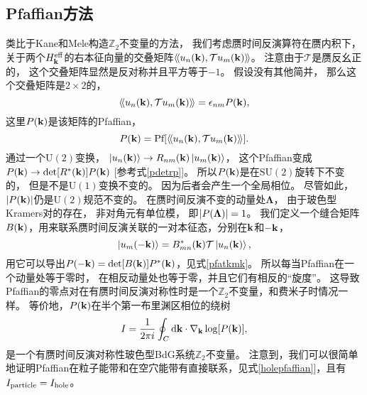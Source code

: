 \subsection{Pfaffian方法}

类比于Kane和Mele构造$\mathbb Z_2$不变量的方法\cite{Kane2005}，
我们考虑赝时间反演算符在赝内积下，
关于两个$H^{\text{eff}}_{\vb k}$的右本征向量的交叠矩阵$\langle\!\langle u_n(\vb k),\mathcal T u_m(\vb k) \rangle\!\rangle$。
注意由于$\mathcal T$是赝反幺正的，
这个交叠矩阵显然是反对称并且平方等于$-1$。
假设没有其他简并，
那么这个交叠矩阵是$2\times 2$的，
\begin{equation}\label{overlap}
	\langle\!\langle u_n(\vb k),\mathcal T u_m(\vb k) \rangle\!\rangle=\epsilon_{nm} P(\vb k),
\end{equation}
这里$P(\vb k)$是该矩阵的Pfaffian，
\begin{equation}
	P(\vb k)=\textnormal{Pf}[\langle\!\langle u_n(\vb k),\mathcal T u_m(\vb k) \rangle\!\rangle].\label{defpf}
\end{equation}
通过一个$\mathrm{U}(2)$变换，
$\ket{u_n(\vb k)} \rightarrow  R_{nm}(\vb k)\ket{u_m(\vb k)}$，
这个Pfaffian变成$P(\vb k) \rightarrow  \det[R^*(\vb k)]P(\vb k)$ [参考式\eqref{pdetrp}]。
所以$P(\vb k)$是在$\mathrm{SU}(2)$旋转下不变的，
但是不是$\mathrm{U}(1)$变换不变的。
因为后者会产生一个全局相位。
尽管如此，
$\abs{P(\vb k)}$仍是$\mathrm{U}(2)$规范不变的。
在赝时间反演不变的动量处$\boldsymbol{\Lambda} $，
由于玻色型Kramers对的存在，
非对角元有单位模，
即$\abs{P(\boldsymbol{\Lambda} )}=1$。
我们定义一个缝合矩阵$B(\vb k)$，用来联系赝时间反演关联的一对本征态，分别在$\vb k$和$-\vb k$，
\begin{equation}
	\ket{u_m(-\vb k)}=B^*_{mn}(\vb k)\mathcal T \ket{u_n(\vb k)},\label{sewingm}
\end{equation}
用它可以导出$P(-\vb k)=\det[B(\vb k)] P^*(\vb k)$，见式\eqref{pfatkmk}。
所以每当Pfaffian在一个动量处等于零时，
在相反动量处也等于零，并且它们有相反的“旋度”。
这导致Pfaffian的零点对在有赝时间反演对称性时是一个$\mathbb Z_2$不变量，和费米子时情况一样\cite{Kane2005}。
等价地，$P(\vb k)$在半个第一布里渊区相位的绕树\begin{equation}
	I= \frac{1}{2\pi i}\oint_C \dd{\vb k}\cdot\nabla_{\vb k}\log[P(\vb k)],\nonumber
\end{equation}
是一个有赝时间反演对称性玻色型BdG系统$\mathbb Z_2$不变量。
注意到，我们可以很简单地证明Pfaffian在粒子能带和在空穴能带有直接联系，见式\eqref{holepfaffian}]，且有$I_\textnormal{particle}=I_\textnormal{hole}$。

